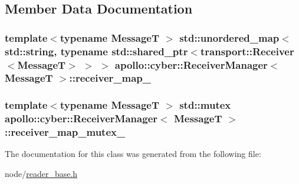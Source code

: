 \subsection{Member Data Documentation}
\hypertarget{classapollo_1_1cyber_1_1ReceiverManager_a14b14b40ce05bdc1677e7ff0d99b2c44}{
\subsubsection[{receiver\-\_\-map\-\_\-}]{\setlength{\rightskip}{0pt plus 5cm}template$<$typename Message\-T $>$ std\-::unordered\-\_\-map$<$std\-::string, typename std\-::shared\-\_\-ptr$<${\bf transport\-::\-Receiver}$<$Message\-T$>$ $>$ $>$ {\bf apollo\-::cyber\-::\-Receiver\-Manager}$<$ Message\-T $>$\-::receiver\-\_\-map\-\_\-\hspace{0.3cm}{\ttfamily [private]}}}\label{classapollo_1_1cyber_1_1ReceiverManager_a14b14b40ce05bdc1677e7ff0d99b2c44}
\hypertarget{classapollo_1_1cyber_1_1ReceiverManager_aec1d31290551f065d0af89d4a94f7c5c}{
\subsubsection[{receiver\-\_\-map\-\_\-mutex\-\_\-}]{\setlength{\rightskip}{0pt plus 5cm}template$<$typename Message\-T $>$ std\-::mutex {\bf apollo\-::cyber\-::\-Receiver\-Manager}$<$ Message\-T $>$\-::receiver\-\_\-map\-\_\-mutex\-\_\-\hspace{0.3cm}{\ttfamily [private]}}}\label{classapollo_1_1cyber_1_1ReceiverManager_aec1d31290551f065d0af89d4a94f7c5c}


The documentation for this class was generated from the following file\-:\begin{DoxyCompactItemize}
\item 
node/\hyperlink{reader__base_8h}{reader\-\_\-base.\-h}\end{DoxyCompactItemize}
